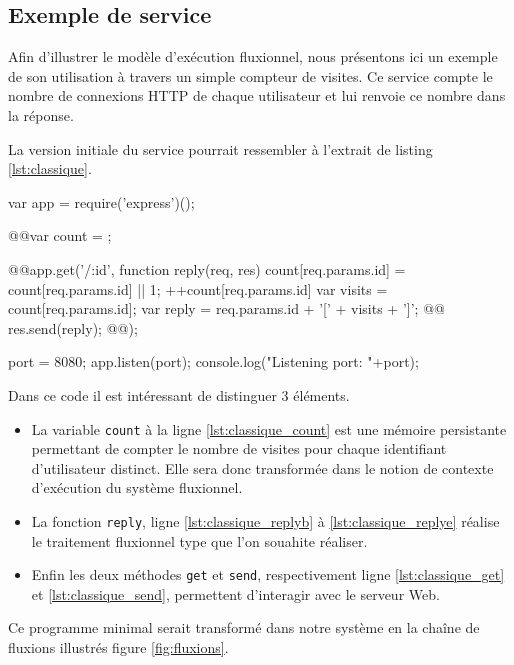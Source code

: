 
\subsection{Exemple de service}

Afin d'illustrer le modèle d'exécution fluxionnel, nous présentons ici un exemple de son utilisation à travers un simple compteur de visites.
Ce service compte le nombre de connexions HTTP de chaque utilisateur et lui renvoie ce nombre dans la réponse.

La version initiale du service pourrait ressembler à l'extrait de listing \ref{lst:classique}.

\begin{code}[Javascript, caption={Service initial},label={lst:classique}]
var app = require('express')();

@\label{lst:classique_count}@var count = {};

@\label{lst:classique_get}\label{lst:classique_replyb}@app.get('/:id', function reply(req, res){
  count[req.params.id] = count[req.params.id]  || 1;
  ++count[req.params.id]
  var visits = count[req.params.id];
  var reply = req.params.id + '[' + visits + ']';
@\label{lst:classique_send}@  res.send(reply);
@\label{lst:classique_replye}@});

port = 8080;
app.listen(port);
console.log("Listening port: "+port);
\end{code}

Dans ce code il est intéressant de distinguer 3 éléments.
\begin{itemize}
  \item La variable \texttt{count} à la ligne \ref{lst:classique_count} est une mémoire persistante permettant de compter le nombre de visites pour chaque identifiant d'utilisateur distinct.
  Elle sera donc transformée dans le notion de contexte d'exécution du système fluxionnel.
  \item La fonction \texttt{reply}, ligne \ref{lst:classique_replyb} à \ref{lst:classique_replye} réalise le traitement fluxionnel type que l'on souahite réaliser.
  \item Enfin les deux méthodes \texttt{get} et \texttt{send}, respectivement ligne \ref{lst:classique_get} et \ref{lst:classique_send}, permettent d'interagir avec le serveur Web.
\end{itemize}

Ce programme minimal serait transformé dans notre système en la chaîne de fluxions illustrés figure \ref{fig:fluxions}.

